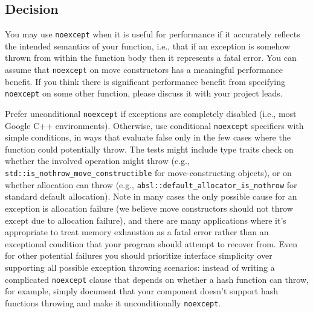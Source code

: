 \subsection{Decision}
You may use \texttt{noexcept} when it is useful for performance if it accurately reflects the intended semantics of your function, i.e., that if an exception is somehow thrown from within the function body then it represents a fatal error. You can assume that \texttt{noexcept} on move constructors has a meaningful performance benefit. If you think there is significant performance benefit from specifying \texttt{noexcept} on some other function, please discuss it with your project leads.

Prefer unconditional \texttt{noexcept} if exceptions are completely disabled (i.e., most Google C++ environments). Otherwise, use conditional \texttt{noexcept} specifiers with simple conditions, in ways that evaluate false only in the few cases where the function could potentially throw. The tests might include type traits check on whether the involved operation might throw (e.g., \texttt{std::is_nothrow_move_constructible} for move-constructing objects), or on whether allocation can throw (e.g., \texttt{absl::default_allocator_is_nothrow} for standard default allocation). Note in many cases the only possible cause for an exception is allocation failure (we believe move constructors should not throw except due to allocation failure), and there are many applications where it’s appropriate to treat memory exhaustion as a fatal error rather than an exceptional condition that your program should attempt to recover from. Even for other potential failures you should prioritize interface simplicity over supporting all possible exception throwing scenarios: instead of writing a complicated \texttt{noexcept} clause that depends on whether a hash function can throw, for example, simply document that your component doesn’t support hash functions throwing and make it unconditionally \texttt{noexcept}.
